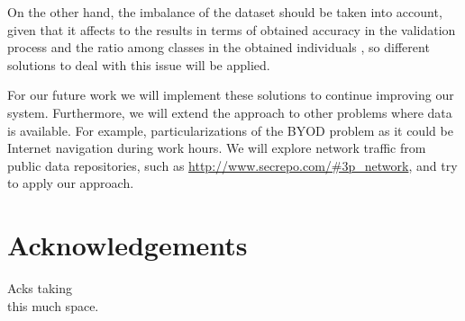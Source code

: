 \documentclass[runningheads]{llncs}
\begin{document}
On the other hand, the imbalance of the dataset should be taken into
account, given that it affects to the results in terms of obtained
accuracy in the validation process and the ratio among classes in the
obtained individuals \cite{Pereira19RuleExtractionProblems}, so different solutions to deal with this issue will be applied. 

For our future work we will implement these solutions to continue
improving our system. Furthermore, we will extend the approach to other problems where data is available. For example, particularizations of the BYOD problem as it could be Internet navigation during work hours. We will explore network traffic from public data repositories, such as \url{http://www.secrepo.com/#3p\_network}, and try to apply our approach. 

\section{Acknowledgements}

Acks taking\\
this much space.

      
   
\end{document}
